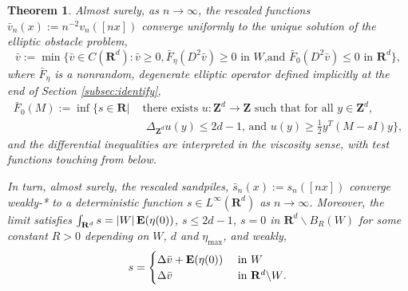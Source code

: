 \documentclass[12pt]{amsart}
\newcommand{\R}{\mathbf{R}}
\newcommand{\Z}{\mathbf{Z}}
\newcommand{\E}{\mathop{\bf E{}}}
\newtheorem{theorem}{Theorem}[section]
\begin{document}
\begin{theorem} \label{thetheorem}
Almost surely, as $n \to \infty$, the rescaled functions $\bar{v}_n(x):= n^{-2} v_n([n x])$ converge uniformly to the unique solution of the elliptic obstacle problem,
\[
\bar{v} := \min \{ \bar{v} \in C(\R^d) : \bar{v} \geq 0,  \bar{F}_{\eta}(D^2 \bar{v}) \geq 0 \mbox{ in $W$,and } \bar{F}_0(D^2 \bar{v}) \leq 0 \mbox{ in $\R^d$}\}, %
\]
where $\bar{F}_\eta$ is a nonrandom, degenerate elliptic operator defined implicitly at the end 
of Section \ref{subsec:identify},
\[
\begin{split}
\bar{F}_0(M) :=  \inf \{ s \in \R | &\mbox{ there exists $u: \Z^d \to \Z$ such that for all $y \in \Z^d$,} \\
&\mbox{ $\Delta_{\Z^d} u(y) \leq 2 d -1$, and $u(y) \geq \frac{1}{2} y^T(M - s I) y$} \},
\end{split}
\]
and the differential inequalities are interpreted in the viscosity sense, with test functions touching from below. %

 In turn, almost surely, the rescaled sandpiles, $\bar{s}_n(x) := s_n( [n x])$ converge weakly-* to a deterministic function $s \in L^\infty(\R^d)$ as $n \to \infty$. Moreover, the limit satisfies 
$\int_{\R^d} s = |W| \E( \eta(0))$, $s \leq 2 d-1$, $s = 0$ in $\R^d \backslash B_R^{}(W)$ for some constant $R > 0$ depending on $W$, $d$ and $\eta_{\max}$, and weakly, %
\[
s = \begin{cases}
 \Delta \bar{v} + \E( \eta(0))  &\mbox{ in $W$ }  \\
  \Delta \bar{v}  &\mbox{ in $\R^d \backslash W$}.
  \end{cases}
\]

\end{theorem}
\end{document}
